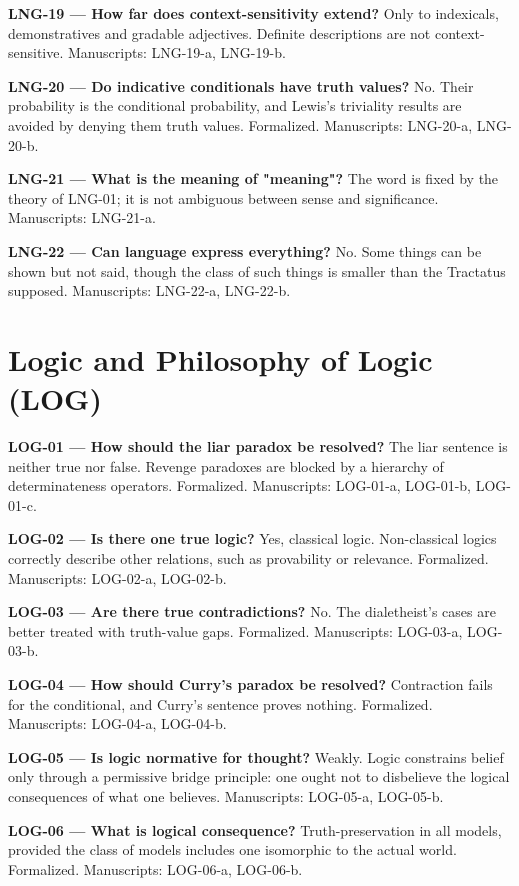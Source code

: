 \documentclass[10pt]{article}
\begin{document}
\textbf{LNG-19 --- How far does context-sensitivity extend?} Only to indexicals, demonstratives and gradable adjectives. Definite descriptions are not context-sensitive. Manuscripts: LNG-19-a, LNG-19-b.

\textbf{LNG-20 --- Do indicative conditionals have truth values?} No. Their probability is the conditional probability, and Lewis's triviality results are avoided by denying them truth values. Formalized. Manuscripts: LNG-20-a, LNG-20-b.

\textbf{LNG-21 --- What is the meaning of "meaning"?} The word is fixed by the theory of LNG-01; it is not ambiguous between sense and significance. Manuscripts: LNG-21-a.

\textbf{LNG-22 --- Can language express everything?} No. Some things can be shown but not said, though the class of such things is smaller than the Tractatus supposed. Manuscripts: LNG-22-a, LNG-22-b.

\section*{Logic and Philosophy of Logic (LOG)}
\textbf{LOG-01 --- How should the liar paradox be resolved?} The liar sentence is neither true nor false. Revenge paradoxes are blocked by a hierarchy of determinateness operators. Formalized. Manuscripts: LOG-01-a, LOG-01-b, LOG-01-c.

\textbf{LOG-02 --- Is there one true logic?} Yes, classical logic. Non-classical logics correctly describe other relations, such as provability or relevance. Formalized. Manuscripts: LOG-02-a, LOG-02-b.

\textbf{LOG-03 --- Are there true contradictions?} No. The dialetheist's cases are better treated with truth-value gaps. Formalized. Manuscripts: LOG-03-a, LOG-03-b.

\textbf{LOG-04 --- How should Curry's paradox be resolved?} Contraction fails for the conditional, and Curry's sentence proves nothing. Formalized. Manuscripts: LOG-04-a, LOG-04-b.

\textbf{LOG-05 --- Is logic normative for thought?} Weakly. Logic constrains belief only through a permissive bridge principle: one ought not to disbelieve the logical consequences of what one believes. Manuscripts: LOG-05-a, LOG-05-b.

\textbf{LOG-06 --- What is logical consequence?} Truth-preservation in all models, provided the class of models includes one isomorphic to the actual world. Formalized. Manuscripts: LOG-06-a, LOG-06-b.
\end{document}
